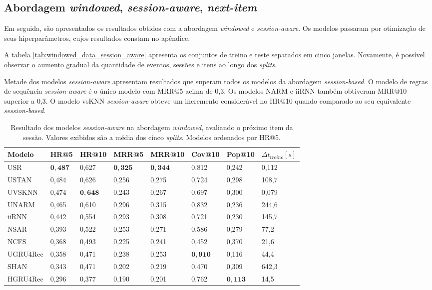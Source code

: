 \newpage

\subsection{Abordagem \textit{windowed}, \textit{session-aware}, \textit{next-item}}

Em seguida, são apresentados os resultados obtidos com a abordagem
\textit{windowed} e \textit{session-aware}. Os modelos passaram por otimização
de seus hiperparâmetros, cujos resultados constam no apêndice.

A tabela \ref{tab:windowed_data_session_aware} apresenta os conjuntos de treino
e teste separados em cinco janelas. Novamente, é possível observar o aumento
gradual da quantidade de eventos, sessões e itens ao longo dos \textit{splits}.

Metade dos modelos \textit{session-aware} apresentam resultados que superam
todos os modelos da abordagem \textit{session-based}. O modelo de regras de
sequência \textit{session-aware} é o único modelo com MRR@5 acima de 0,3. Os
modelos NARM e iiRNN também obtiveram MRR@10 superior a 0,3. O modelo vsKNN
\textit{session-aware} obteve um incremento considerável no HR@10 quando
comparado ao seu equivalente \textit{session-based}.

\begin{table}[htbp]
  \begin{tabular}{|l|l|l|l|l|l|l|l|}
    \hline
    Modelo & HR@5 & HR@10 & MRR@5 & MRR@10 & Cov@10 & Pop@10 & $\Delta t_{treino} [s]$ \\
    \hline
    USR & $\mathbf{0,487}$ & 0,627 & $\mathbf{0,325}$ & $\mathbf{0,344}$ & 0,812 & 0,242 & 0,112 \\
    \hline
    USTAN & 0,484 & 0,626 & 0,256 & 0,275 & 0,724 & 0,298 & 108,7 \\
    \hline
    UVSKNN & 0,474 & $\mathbf{0,648}$ & 0,243 & 0,267 & 0,697 & 0,300 & 0,079 \\
    \hline
    UNARM & 0,465 & 0,610 & 0,296 & 0,315 & 0,832 & 0,236 & 244,6 \\
    \hline
    iiRNN & 0,442 & 0,554 & 0,293 & 0,308 & 0,721 & 0,230 & 145,7 \\
    \hline
    NSAR & 0,393 & 0,522 & 0,253 & 0,271 & 0,586 & 0,279 & 77,2 \\
    \hline
    NCFS & 0,368 & 0,493 & 0,225 & 0,241 & 0,452 & 0,370 & 21,6 \\
    \hline
    UGRU4Rec & 0,358 & 0,471 & 0,238 & 0,253 & $\mathbf{0,910}$ & 0,116 & 44,4 \\
    \hline
    SHAN & 0,343 & 0,471 & 0,202 & 0,219 & 0,470 & 0,309 & 642,3 \\
    \hline
    HGRU4Rec & 0,296 & 0,377 & 0,190 & 0,201 & 0,762 & $\mathbf{0,113}$ & 14,5 \\
    \hline
    \end{tabular}
  \caption{Resultado dos modelos \textit{session-aware} na abordagem
  \textit{windowed}, avaliando o próximo item da sessão. Valores exibidos são a
  média dos cinco \textit{splits}. Modelos ordenados por HR@5. }
\end{table}
\newpage

